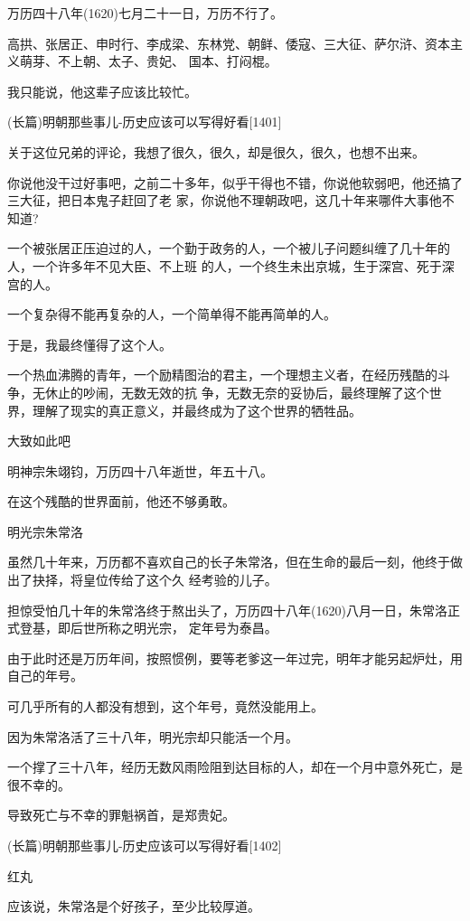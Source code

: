 \documentclass[11pt,a4paper,onecolumn]{article}
\begin{document}
万历四十八年(1620)七月二十一日，万历不行了。

高拱、张居正、申时行、李成梁、东林党、朝鲜、倭寇、三大征、萨尔浒、资本主义萌芽、不上朝、太子、贵妃、
国本、打闷棍。

我只能说，他这辈子应该比较忙。

(长篇)明朝那些事儿-历史应该可以写得好看$[$1401$]$

关于这位兄弟的评论，我想了很久，很久，却是很久，很久，也想不出来。

你说他没干过好事吧，之前二十多年，似乎干得也不错，你说他软弱吧，他还搞了三大征，把日本鬼子赶回了老
家，你说他不理朝政吧，这几十年来哪件大事他不知道?

一个被张居正压迫过的人，一个勤于政务的人，一个被儿子问题纠缠了几十年的人，一个许多年不见大臣、不上班
的人，一个终生未出京城，生于深宫、死于深宫的人。

一个复杂得不能再复杂的人，一个简单得不能再简单的人。

于是，我最终懂得了这个人。

一个热血沸腾的青年，一个励精图治的君主，一个理想主义者，在经历残酷的斗争，无休止的吵闹，无数无效的抗
争，无数无奈的妥协后，最终理解了这个世界，理解了现实的真正意义，并最终成为了这个世界的牺牲品。

大致如此吧

明神宗朱翊钧，万历四十八年逝世，年五十八。

在这个残酷的世界面前，他还不够勇敢。

明光宗朱常洛

虽然几十年来，万历都不喜欢自己的长子朱常洛，但在生命的最后一刻，他终于做出了抉择，将皇位传给了这个久
经考验的儿子。

担惊受怕几十年的朱常洛终于熬出头了，万历四十八年(1620)八月一日，朱常洛正式登基，即后世所称之明光宗，
定年号为泰昌。

由于此时还是万历年间，按照惯例，要等老爹这一年过完，明年才能另起炉灶，用自己的年号。

可几乎所有的人都没有想到，这个年号，竟然没能用上。

因为朱常洛活了三十八年，明光宗却只能活一个月。

一个撑了三十八年，经历无数风雨险阻到达目标的人，却在一个月中意外死亡，是很不幸的。

导致死亡与不幸的罪魁祸首，是郑贵妃。

(长篇)明朝那些事儿-历史应该可以写得好看$[$1402$]$

红丸

应该说，朱常洛是个好孩子，至少比较厚道。
\end{document}
